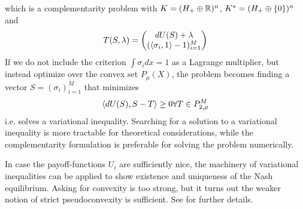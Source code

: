 which is a complementarity problem with $K = (H_+ \oplus \mathbb{R})^n$, $K^* = (H_+ \oplus \{0\})^n$ and
\begin{equation}
  T(S,\lambda)=\begin{pmatrix} dU(S) + \lambda \\ (\left \langle \sigma_i,1 \right \rangle - 1)_{i=1}^M \end{pmatrix}
\end{equation}
If we do not include the criterion $\int \sigma_i dx = 1$ as a Lagrange multiplier, but instead optimize over the convex set $P_\mu(X)$, the problem  becomes finding a vector $S = (\sigma_i)_{i=1}^M$ that minimizes
\begin{equation}
  \left \langle dU(S),S-T \right \rangle \geq 0 \forall T\in P_{2,\mu}^M
\end{equation}
i.e. solves a variational inequality. Searching for a solution to a variational inequality is more tractable for theoretical considerations, while the complementarity formulation is preferable for solving the problem numerically.

In case the payoff-functions $U_i $ are sufficiently nice, the machinery of variational inequalities can be applied to show existence and uniqueness of the Nash equilibrium. Asking for convexity is too strong, but it turns out the weaker notion of strict pseudoconvexity is sufficient. See  for further details.

